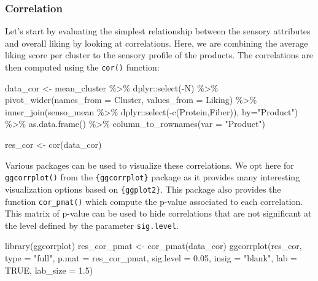 \documentclass[
]{krantz}
\makeatletter
\newenvironment{Shaded}{\begin{snugshade}}{\end{snugshade}}
\newcommand{\AttributeTok}[1]{\textcolor[rgb]{0.61,0.61,0.61}{#1}}
\newcommand{\ConstantTok}[1]{\textcolor[rgb]{0,0,0}{#1}}
\newcommand{\FloatTok}[1]{\textcolor[rgb]{0.06,0.06,0.06}{#1}}
\newcommand{\FunctionTok}[1]{\textcolor[rgb]{0,0,0}{#1}}
\newcommand{\NormalTok}[1]{#1}
\newcommand{\OtherTok}[1]{\textcolor[rgb]{0.37,0.37,0.37}{#1}}
\newcommand{\SpecialCharTok}[1]{\textcolor[rgb]{0,0,0}{#1}}
\newcommand{\StringTok}[1]{\textcolor[rgb]{0.5,0.5,0.5}{#1}}
\newenvironment{kframe}{%
\medskip{}
\setlength{\fboxsep}{.8em}
 \def\at@end@of@kframe{}%
 \ifinner\ifhmode%
  \def\at@end@of@kframe{\end{minipage}}%
  \begin{minipage}{\columnwidth}%
 \fi\fi%
 \def\FrameCommand##1{\hskip\@totalleftmargin \hskip-\fboxsep
 \colorbox{shadecolor}{##1}\hskip-\fboxsep
     \hskip-\linewidth \hskip-\@totalleftmargin \hskip\columnwidth}%
 \MakeFramed {\advance\hsize-\width
   \@totalleftmargin\z@ \linewidth\hsize
   \@setminipage}}%
 {\par\unskip\endMakeFramed%
 \at@end@of@kframe}
\renewenvironment{Shaded}{\begin{kframe}}{\end{kframe}}
\makeatother
\begin{document}
\hypertarget{correlation}{%
\subsubsection{Correlation}\label{correlation}}

Let's start by evaluating the simplest relationship between the sensory attributes and overall liking by looking at correlations. Here, we are combining the average liking score per cluster to the sensory profile of the products. The correlations are then computed using the \texttt{cor()} function:

\begin{Shaded}
\begin{Highlighting}[]
\NormalTok{data\_cor }\OtherTok{\textless{}{-}}\NormalTok{ mean\_cluster }\SpecialCharTok{\%\textgreater{}\%}
\NormalTok{  dplyr}\SpecialCharTok{::}\FunctionTok{select}\NormalTok{(}\SpecialCharTok{{-}}\NormalTok{N) }\SpecialCharTok{\%\textgreater{}\%}
  \FunctionTok{pivot\_wider}\NormalTok{(}\AttributeTok{names\_from =}\NormalTok{ Cluster, }\AttributeTok{values\_from =}\NormalTok{ Liking) }\SpecialCharTok{\%\textgreater{}\%}
  \FunctionTok{inner\_join}\NormalTok{(senso\_mean }\SpecialCharTok{\%\textgreater{}\%} 
\NormalTok{               dplyr}\SpecialCharTok{::}\FunctionTok{select}\NormalTok{(}\SpecialCharTok{{-}}\FunctionTok{c}\NormalTok{(Protein,Fiber)), }\AttributeTok{by=}\StringTok{"Product"}\NormalTok{) }\SpecialCharTok{\%\textgreater{}\%}
  \FunctionTok{as.data.frame}\NormalTok{() }\SpecialCharTok{\%\textgreater{}\%}
  \FunctionTok{column\_to\_rownames}\NormalTok{(}\AttributeTok{var =} \StringTok{"Product"}\NormalTok{)}

\NormalTok{res\_cor }\OtherTok{\textless{}{-}} \FunctionTok{cor}\NormalTok{(data\_cor)}
\end{Highlighting}
\end{Shaded}

Various packages can be used to visualize these correlations. We opt here for \texttt{ggcorrplot()} from the \texttt{\{ggcorrplot\}} package as it provides many interesting visualization options based on \texttt{\{ggplot2\}}. This package also provides the function \texttt{cor\_pmat()} which compute the p-value associated to each correlation. This matrix of p-value can be used to hide correlations that are not significant at the level defined by the parameter \texttt{sig.level}.

\begin{Shaded}
\begin{Highlighting}[]
\FunctionTok{library}\NormalTok{(ggcorrplot)}
\NormalTok{res\_cor\_pmat }\OtherTok{\textless{}{-}} \FunctionTok{cor\_pmat}\NormalTok{(data\_cor)}
\FunctionTok{ggcorrplot}\NormalTok{(res\_cor, }\AttributeTok{type =} \StringTok{"full"}\NormalTok{, }\AttributeTok{p.mat =}\NormalTok{ res\_cor\_pmat, }
           \AttributeTok{sig.level =} \FloatTok{0.05}\NormalTok{, }\AttributeTok{insig =} \StringTok{"blank"}\NormalTok{, }
           \AttributeTok{lab =} \ConstantTok{TRUE}\NormalTok{, }\AttributeTok{lab\_size =} \FloatTok{1.5}\NormalTok{)}
\end{Highlighting}
\end{Shaded}
\end{document}
